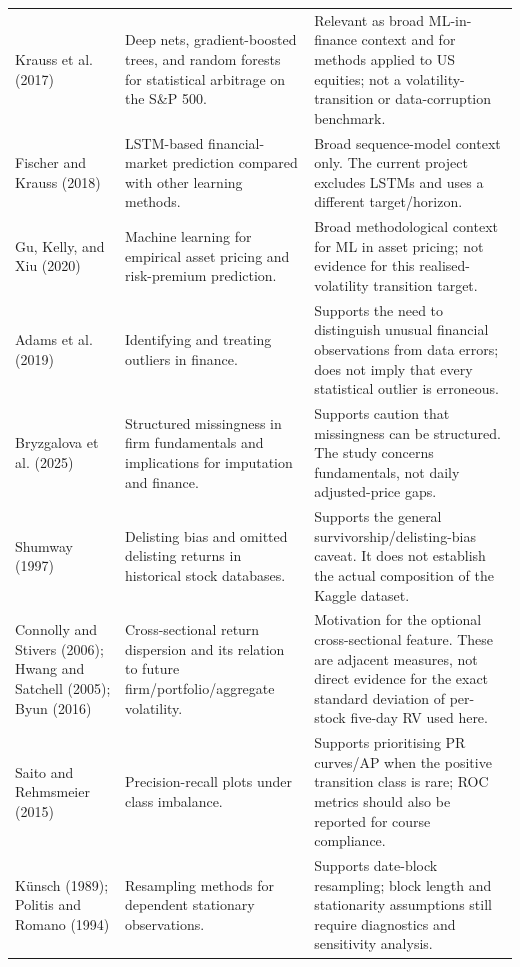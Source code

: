 \documentclass[11pt,a4paper]{article}
\begin{document}
\begin{longtable}{p{3.5cm}p{5.1cm}p{5.3cm}}
\addlinespace
Krauss et al. (2017) \cite{Krauss2017} & Deep nets, gradient-boosted trees, and random forests for statistical arbitrage on the S\&P 500. & Relevant as broad ML-in-finance context and for methods applied to US equities; not a volatility-transition or data-corruption benchmark.\\
\addlinespace
Fischer and Krauss (2018) \cite{FischerKrauss2018} & LSTM-based financial-market prediction compared with other learning methods. & Broad sequence-model context only. The current project excludes LSTMs and uses a different target/horizon.\\
\addlinespace
Gu, Kelly, and Xiu (2020) \cite{GuKellyXiu2020} & Machine learning for empirical asset pricing and risk-premium prediction. & Broad methodological context for ML in asset pricing; not evidence for this realised-volatility transition target.\\
\addlinespace
Adams et al. (2019) & Identifying and treating outliers in finance. & Supports the need to distinguish unusual financial observations from data errors; does not imply that every statistical outlier is erroneous.\\
\addlinespace
Bryzgalova et al. (2025) & Structured missingness in firm fundamentals and implications for imputation and finance. & Supports caution that missingness can be structured. The study concerns fundamentals, not daily adjusted-price gaps.\\
\addlinespace
Shumway (1997) & Delisting bias and omitted delisting returns in historical stock databases. & Supports the general survivorship/delisting-bias caveat. It does not establish the actual composition of the Kaggle dataset.\\
\addlinespace
Connolly and Stivers (2006); Hwang and Satchell (2005); Byun (2016) & Cross-sectional return dispersion and its relation to future firm/portfolio/aggregate volatility. & Motivation for the optional cross-sectional feature. These are adjacent measures, not direct evidence for the exact standard deviation of per-stock five-day RV used here.\\
\addlinespace
Saito and Rehmsmeier (2015) & Precision-recall plots under class imbalance. & Supports prioritising PR curves/AP when the positive transition class is rare; ROC metrics should also be reported for course compliance.\\
\addlinespace
K\"unsch (1989); Politis and Romano (1994) & Resampling methods for dependent stationary observations. & Supports date-block resampling; block length and stationarity assumptions still require diagnostics and sensitivity analysis.\\
\bottomrule
\end{longtable}
\end{document}
